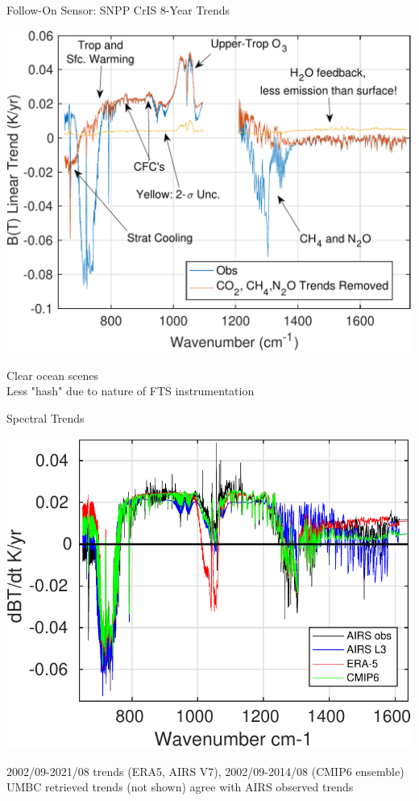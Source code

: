 \documentclass[10pt,t]{beamer}
\begin{document}
\begin{frame}{Follow-On Sensor: SNPP CrIS 8-Year Trends}
\begin{center}
\includegraphics[width=0.8\linewidth]{SunClimate2022/cris_dbt_clear_all_lats_lwmw_annotated.pdf}
\end{center}
\vspace{-0.1in}
\footnotesize Clear ocean scenes \\
\footnotesize Less "hash" due to nature of FTS instrumentation
\end{frame}

\begin{frame}{Spectral Trends}
\begin{center}
\includegraphics[width=0.8\linewidth]{NEWFIGS/model_vs_obs_BTtrends.pdf}
\end{center}
\footnotesize 2002/09-2021/08 trends (ERA5, AIRS V7), 2002/09-2014/08 (CMIP6 ensemble) \newline
\footnotesize UMBC retrieved trends (not shown) agree with AIRS observed trends
\end{frame}
\end{document}
